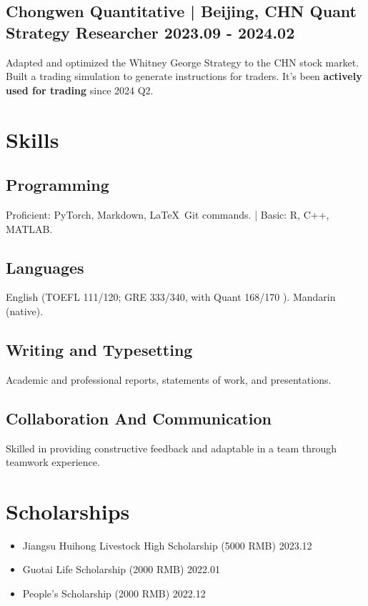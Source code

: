 \documentclass[a4paper]{article}
\begin{document}
\subsection{Chongwen Quantitative \normalfont | Beijing, CHN \hfill Quant Strategy Researcher  \hspace{40pt} 2023.09 - 2024.02}
Adapted and optimized the Whitney George Strategy to the CHN stock market. Built a trading simulation to generate instructions for traders. It's been \textbf{actively used for trading }since 2024 Q2.


\section{Skills}

\subsection{Programming}
Proficient: PyTorch, Markdown, \LaTeX\, Git commands. | Basic: R, C++, MATLAB.

\subsection{Languages}
English (TOEFL 111/120; GRE 333/340, with Quant 168/170 ). Mandarin (native). 

\subsection{Writing and Typesetting}
Academic and professional reports, statements of work, and presentations.

\subsection{Collaboration And Communication}
Skilled in providing constructive feedback and adaptable in a team through teamwork experience.

\section{Scholarships}
\begin{itemize}
    \item Jiangsu Huihong Livestock High Scholarship (5000 RMB) \hfill 2023.12
    \item Guotai Life Scholarship (2000 RMB) \hfill 2022.01
    \item People's Scholarship (2000 RMB) \hfill 2022.12
\end{itemize}
\end{document}
